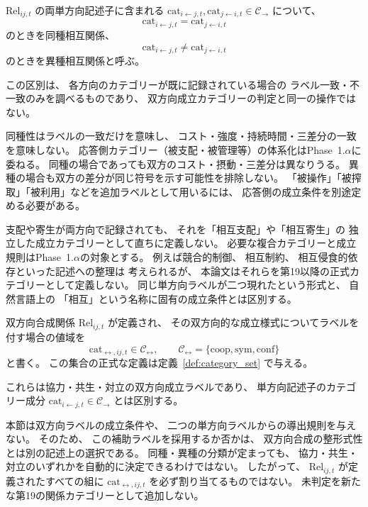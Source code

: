 \begin{definition}[同種相互関係と異種相互関係]
\label{def:homo_hetero_relation}
$\mathrm{Rel}_{ij,t}$ の両単方向記述子に含まれる
$\mathrm{cat}_{i\leftarrow j,t}, \mathrm{cat}_{j\leftarrow i,t}\in\mathcal C_{\rightarrow}$ について、
\[
 \mathrm{cat}_{i\leftarrow j,t}=\mathrm{cat}_{j\leftarrow i,t}
\]
のときを同種相互関係、
\[
 \mathrm{cat}_{i\leftarrow j,t}\neq \mathrm{cat}_{j\leftarrow i,t}
\]
のときを異種相互関係と呼ぶ。

この区別は、
各方向のカテゴリーが既に記録されている場合の
ラベル一致・不一致のみを調べるものであり、
双方向成立カテゴリーの判定と同一の操作ではない。
\end{definition}

\begin{remark}[同種・異種の分類の制限]
\label{rem:homo_hetero_rel}
同種性はラベルの一致だけを意味し、
コスト・強度・持続時間・三差分の一致を意味しない。
応答側カテゴリー（被支配・被管理等）の体系化はPhase~1.$\alpha$に委ねる。
同種の場合であっても双方のコスト・摂動・三差分は異なりうる。
異種の場合も双方の差分が同じ符号を示す可能性を排除しない。
「被操作」「被搾取」「被利用」などを追加ラベルとして用いるには、
応答側の成立条件を別途定める必要がある。
\end{remark}

\begin{remark}[同種相互形を持たないカテゴリー]
\label{rem:no_mutual_form}
支配や寄生が両方向で記録されても、
それを「相互支配」や「相互寄生」の
独立した成立カテゴリーとして直ちに定義しない。
必要な複合カテゴリーと成立規則はPhase~1.$\alpha$の対象とする。
例えば競合的制御、
相互制約、
相互侵食的依存といった記述への整理は
考えられるが、
本論文はそれらを第19以降の正式カテゴリーとして定義しない。
同じ単方向ラベルが二つ現れたという形式と、
自然言語上の
「相互」という名称に固有の成立条件とは区別する。
\end{remark}

\begin{definition}
\label{def:bidirectional_category}
双方向合成関係 $\mathrm{Rel}_{ij,t}$ が定義され、
その双方向的な成立様式についてラベルを付す場合の値域を
\[
 \mathrm{cat}_{\leftrightarrow,ij,t}\in\mathcal C_{\leftrightarrow},\qquad
 \mathcal C_{\leftrightarrow}=
 \{\mathrm{coop},\mathrm{sym},\mathrm{conf}\}
\]
と書く。
この集合の正式な定義は定義~\ref{def:category_set} で与える。

これらは協力・共生・対立の双方向成立ラベルであり、
単方向記述子のカテゴリー成分 $\mathrm{cat}_{i\leftarrow j,t}\in\mathcal C_{\rightarrow}$ とは区別する。

本節は双方向ラベルの成立条件や、
二つの単方向ラベルからの導出規則を与えない。
そのため、
この補助ラベルを採用するか否かは、
双方向合成の整形式性とは別の記述上の選択である。
同種・異種の分類が定まっても、
協力・共生・対立のいずれかを自動的に決定できるわけではない。
したがって、
$\mathrm{Rel}_{ij,t}$ が定義されたすべての組に
$\mathrm{cat}_{\leftrightarrow,ij,t}$ を必ず割り当てるものではない。
未判定を新たな第19の関係カテゴリーとして追加しない。
\end{definition}

